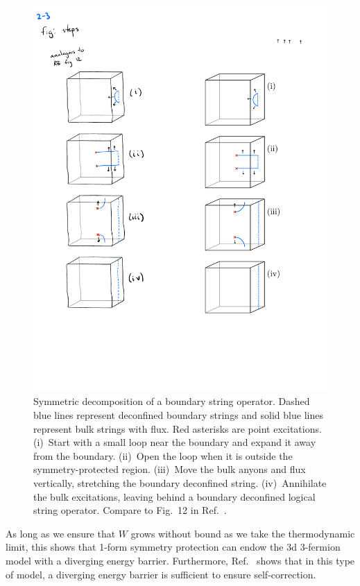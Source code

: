 \documentclass[twocolumn, longbibliography]{revtex4-2}
\begin{document}
\begin{figure}
\centering
\includegraphics{steps}
\caption{Symmetric decomposition of a boundary string operator. Dashed blue lines represent deconfined boundary strings and solid blue lines represent bulk strings with flux. Red asterisks are point excitations. (i)~Start with a small loop near the boundary and expand it away from the boundary. (ii)~Open the loop when it is outside the symmetry-protected region. (iii)~Move the bulk anyons and flux vertically, stretching the boundary deconfined string. (iv)~Annihilate the bulk excitations, leaving behind a boundary deconfined logical string operator. Compare to Fig.~12 in Ref.~\cite{RobertsBartlett}.}
\label{fig:steps}
\end{figure}

As long as we ensure that $W$ grows without bound as we take the thermodynamic limit, this shows that 1-form symmetry protection can endow the 3d 3-fermion model with a diverging energy barrier. Furthermore, Ref.~\cite{RobertsBartlett} shows that in this type of model, a diverging energy barrier is sufficient to ensure self-correction.
\end{document}
